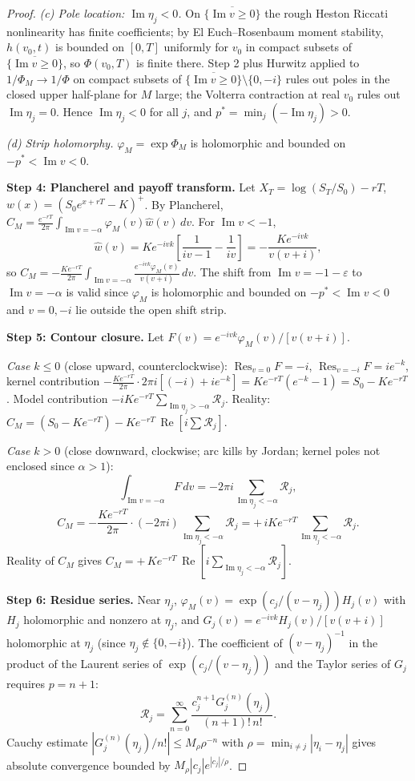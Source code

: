 \documentclass{article}
\newcommand{\Real}{\operatorname{Re}}
\newcommand{\Imag}{\operatorname{Im}}
\newcommand{\Res}{\operatorname*{Res}}
\begin{document}
\begin{proof}
\emph{(c) Pole location: $\Imag\eta_j<0$.} On
$\overline{\{\Imag v\ge 0\}}$ the rough Heston Riccati nonlinearity
has finite coefficients; by El Euch--Rosenbaum moment stability,
$h(v_0,t)$ is bounded on $[0,T]$ uniformly for $v_0$ in compact
subsets of $\overline{\{\Imag v\ge 0\}}$, so $\Phi(v_0,T)$ is finite
there. Step 2 plus Hurwitz applied to $1/\Phi_M\to 1/\Phi$ on compact
subsets of $\overline{\{\Imag v\ge 0\}}\setminus\{0,-i\}$ rules out
poles in the closed upper half-plane for $M$ large; the Volterra
contraction at real $v_0$ rules out $\Imag\eta_j=0$. Hence
$\Imag\eta_j<0$ for all $j$, and $p^\ast=\min_j(-\Imag\eta_j)>0$.

\emph{(d) Strip holomorphy.} $\varphi_M=\exp\Phi_M$ is holomorphic
and bounded on $-p^\ast<\Imag v<0$.

\textbf{Step 4: Plancherel and payoff transform.}
Let $X_T=\log(S_T/S_0)-rT$, $w(x)=(S_0e^{x+rT}-K)^+$. By Plancherel,
$C_M=\frac{e^{-rT}}{2\pi}\!\int_{\Imag v=-\alpha}\varphi_M(v)\widehat w(v)\,dv$.
For $\Imag v<-1$,
\[
\widehat w(v)=Ke^{-ivk}\!\left[\frac{1}{iv-1}-\frac{1}{iv}\right]
=-\frac{Ke^{-ivk}}{v(v+i)},
\]
so $C_M=-\frac{Ke^{-rT}}{2\pi}\!\int_{\Imag v=-\alpha}\!
\frac{e^{-ivk}\varphi_M(v)}{v(v+i)}\,dv$. The shift from
$\Imag v=-1-\varepsilon$ to $\Imag v=-\alpha$ is valid since
$\varphi_M$ is holomorphic and bounded on $-p^\ast<\Imag v<0$ and
$v=0,-i$ lie outside the open shift strip.

\textbf{Step 5: Contour closure.}
Let $F(v)=e^{-ivk}\varphi_M(v)/[v(v+i)]$.

\emph{Case $k\le 0$} (close upward, counterclockwise):
$\Res_{v=0}F=-i$, $\Res_{v=-i}F=ie^{-k}$, kernel contribution
$-\frac{Ke^{-rT}}{2\pi}\cdot 2\pi i[(-i)+ie^{-k}]=Ke^{-rT}(e^{-k}-1)
=S_0-Ke^{-rT}$. Model contribution
$-iKe^{-rT}\!\sum_{\Imag\eta_j>-\alpha}\!\mathcal{R}_j$. Reality:
$C_M=(S_0-Ke^{-rT})-Ke^{-rT}\,\Real[i\sum\mathcal{R}_j]$.

\emph{Case $k>0$} (close downward, clockwise; arc kills by Jordan;
kernel poles not enclosed since $\alpha>1$):
\[
\int_{\Imag v=-\alpha}\!F\,dv=-2\pi i\!\!\sum_{\Imag\eta_j<-\alpha}\!\!\mathcal{R}_j,
\]
\[
C_M=-\frac{Ke^{-rT}}{2\pi}\cdot(-2\pi i)\!\!\sum_{\Imag\eta_j<-\alpha}\!\!\mathcal{R}_j
=+\,iKe^{-rT}\!\!\sum_{\Imag\eta_j<-\alpha}\!\!\mathcal{R}_j.
\]
Reality of $C_M$ gives
$C_M=+\,Ke^{-rT}\,\Real[i\!\sum_{\Imag\eta_j<-\alpha}\!\mathcal{R}_j]$.

\textbf{Step 6: Residue series.}
Near $\eta_j$, $\varphi_M(v)=\exp(c_j/(v-\eta_j))H_j(v)$ with $H_j$
holomorphic and nonzero at $\eta_j$, and
$G_j(v)=e^{-ivk}H_j(v)/[v(v+i)]$ holomorphic at $\eta_j$ (since
$\eta_j\notin\{0,-i\}$). The coefficient of $(v-\eta_j)^{-1}$ in the
product of the Laurent series of $\exp(c_j/(v-\eta_j))$ and the Taylor
series of $G_j$ requires $p=n+1$:
\[
\mathcal{R}_j=\sum_{n=0}^\infty\frac{c_j^{n+1}G_j^{(n)}(\eta_j)}{(n+1)!\,n!}.
\]
Cauchy estimate $|G_j^{(n)}(\eta_j)/n!|\le M_\rho\rho^{-n}$ with
$\rho=\min_{i\ne j}|\eta_i-\eta_j|$ gives absolute convergence
bounded by $M_\rho|c_j|e^{|c_j|/\rho}$.


\end{proof}
\end{document}
